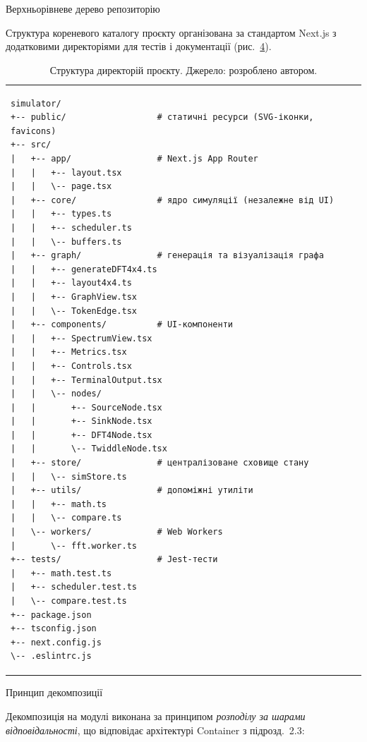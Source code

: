 Верхньорівневе дерево репозиторію

Структура кореневого каталогу проєкту організована за стандартом Next.js
з додатковими директоріями для тестів і документації
(рис.~\hyperref[fig:project_tree]{4}).

\begin{longtable}[]{@{}
  >{\raggedright\arraybackslash}p{}@{}}
\caption{Структура директорій проєкту. Джерело: розроблено
автором.}\tabularnewline
\toprule\noalign{}
\endfirsthead
\endhead
\bottomrule\noalign{}
\endlastfoot
\begin{minipage}[t]{\linewidth}\raggedright
\begin{verbatim}
simulator/
+-- public/                  # статичні ресурси (SVG-іконки, favicons)
+-- src/
|   +-- app/                 # Next.js App Router
|   |   +-- layout.tsx
|   |   \-- page.tsx
|   +-- core/                # ядро симуляції (незалежне від UI)
|   |   +-- types.ts
|   |   +-- scheduler.ts
|   |   \-- buffers.ts
|   +-- graph/               # генерація та візуалізація графа
|   |   +-- generateDFT4x4.ts
|   |   +-- layout4x4.ts
|   |   +-- GraphView.tsx
|   |   \-- TokenEdge.tsx
|   +-- components/          # UI-компоненти
|   |   +-- SpectrumView.tsx
|   |   +-- Metrics.tsx
|   |   +-- Controls.tsx
|   |   +-- TerminalOutput.tsx
|   |   \-- nodes/
|   |       +-- SourceNode.tsx
|   |       +-- SinkNode.tsx
|   |       +-- DFT4Node.tsx
|   |       \-- TwiddleNode.tsx
|   +-- store/               # централізоване сховище стану
|   |   \-- simStore.ts
|   +-- utils/               # допоміжні утиліти
|   |   +-- math.ts
|   |   \-- compare.ts
|   \-- workers/             # Web Workers
|       \-- fft.worker.ts
+-- tests/                   # Jest-тести
|   +-- math.test.ts
|   +-- scheduler.test.ts
|   \-- compare.test.ts
+-- package.json
+-- tsconfig.json
+-- next.config.js
\-- .eslintrc.js
\end{verbatim}
\end{minipage} \\
\end{longtable}

Принцип декомпозиції

Декомпозиція на модулі виконана за принципом \emph{розподілу за шарами
відповідальності}, що відповідає архітектурі Container з підрозд.~2.3:

